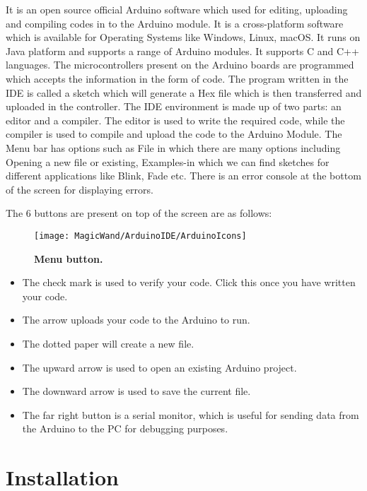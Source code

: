 It is an open source official Arduino software which used for editing, uploading and
compiling codes in to the Arduino module. It is a cross-platform software which is
available for Operating Systems like Windows, Linux, macOS. It runs on Java platform
and supports a range of Arduino modules. It supports C and C++ languages. The
microcontrollers present on the Arduino boards are programmed which accepts the
information in the form of code. The program written in the IDE is called a sketch
which will generate a Hex file which is then transferred and uploaded in the controller.
The IDE environment is made up of two parts: an editor and a compiler. The editor
is used to write the required code, while the compiler is used to compile and upload
the code to the Arduino Module.\cite{Fezari:2018}
The Menu bar has options such as File in which there are many options including
Opening a new file or existing, Examples-in which we can find sketches for different
applications like Blink, Fade etc. There is an error console at the bottom of the screen
for displaying errors.

The 6 buttons are present on top of the screen are as follows:

\begin{figure}[H]\centering
    \texttt{[image: MagicWand/ArduinoIDE/ArduinoIcons]}
    \caption{\textbf{Menu button.}}
    \label{fig::ArduinoIDEmenubar}		
\end{figure}


\begin{itemize}
    \item	The check mark is used to verify your code. Click this once you have written your code.
    \item	The arrow uploads your code to the Arduino to run.
    \item	The dotted paper will create a new file.
    \item	The upward arrow is used to open an existing Arduino project.
    \item	The downward arrow is used to save the current file.
    \item	The far right button is a serial monitor, which is useful for sending data from the Arduino to the PC for debugging purposes.
    
\end{itemize}
\section{Installation}

